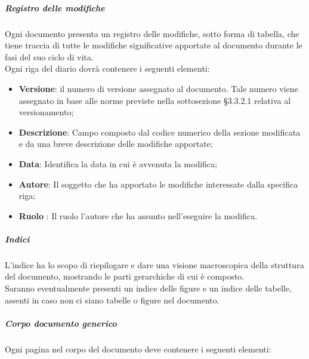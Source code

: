                 \subparagraph{Registro delle modifiche}
                    Ogni documento presenta un registro delle modifiche, sotto forma di tabella, che tiene traccia di tutte le modifiche significative apportate al documento durante le fasi del suo ciclo di vita. \\
                    Ogni riga del diario dovrà contenere i seguenti elementi: \\
                    \begin{itemize}
                        \item\textbf{Versione}: il numero di versione assegnato al documento. Tale numero viene assegnato in base alle norme previste nella sottosezione §3.3.2.1 relativa al versionamento;
                        \item\textbf{Descrizione}: Campo composto dal codice numerico della sezione modificata e da una breve descrizione delle modifiche apportate;
                        \item\textbf{Data}: Identifica la data in cui è avvenuta la modifica;
                        \item\textbf{Autore}: Il soggetto che ha apportato le modifiche interessate dalla specifica riga;
                        \item\textbf{Ruolo} : Il ruolo l’autore che ha assunto nell’eseguire la modifica.
                    \end{itemize}
                \subparagraph{Indici}
                    L’indice ha lo scopo di riepilogare e dare una visione macroscopica della struttura del documento, mostrando le parti gerarchiche di cui è composto. \\
                    Saranno eventualmente presenti un indice delle figure e un indice delle tabelle, assenti in caso non ci siano tabelle o figure nel documento.
                \subparagraph{Corpo documento generico}
                    Ogni pagina nel corpo del documento deve contenere i seguenti elementi:\\
